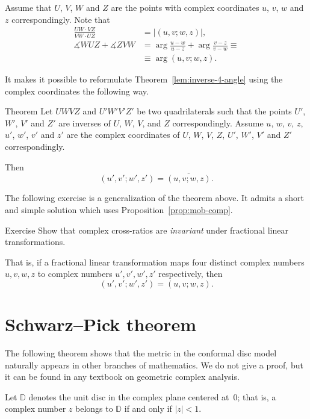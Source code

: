 Assume that $U$, $V$, $W$ and  $Z$ are the points with complex coordinates  
$u$, $v$, $w$ and $z$ correspondingly.
Note that 
\begin{align*}
\frac{UW\cdot VZ}{VW\cdot UZ}&=|(u,v;w,z)|,
\\
\measuredangle WUZ +\measuredangle ZVW&=\arg\frac{u-w}{u-z}+\arg\frac{v-z}{v-w}\equiv 
\\
&\equiv \arg(u,v;w,z).
\end{align*}

It makes it possible to reformulate Theorem~\ref{lem:inverse-4-angle} using the complex coordinates
the following way.

\begin{thm}{Theorem}\label{lem:inverse-4-angle-C}
Let $UWVZ$ and $U'W'V'Z'$  be two quadrilaterals 
such that the points $U'$, $W'$, $V'$ and $Z'$ are inverses of $U$, $W$, $V$, and $Z$ correspondingly.
Assume $u$, $w$, $v$, $z$, $u'$, $w'$, $v'$ and $z'$ are the complex coordinates of $U$, $W$, $V$, $Z$, $U'$, $W'$, $V'$ and $Z'$ correspondingly.

Then 
$$(u',v';w',z')=\overline{(u,v;w,z)}.$$

\end{thm}

The following exercise is a generalization of the theorem above.
It admits a short and simple solution which uses Proposition~\ref{prop:mob-comp}.

\begin{thm}{Exercise}\label{ex:C-cross-ratio}
Show that 
complex cross-ratios are {}\emph{invariant} under fractional linear transformations. 

That is, if a fractional linear transformation maps four distinct complex numbers $u, v, w, z$ to complex numbers $u', v', w', z'$ respectively, then
$$
(u',v';w',z')
=
(u,v;w,z).
$$

\end{thm}

\section*{Schwarz--Pick theorem}
The following theorem shows 
that the metric in the conformal disc model naturally appears in other branches of mathematics.
We do not give a proof, but it can be found in any textbook on geometric complex analysis.

Let $\mathbb{D}$ denotes the unit disc in the complex plane centered at~$0$;
that is, a complex number $z$
belongs to $\mathbb{D}$ if and only if $|z|<1$.

